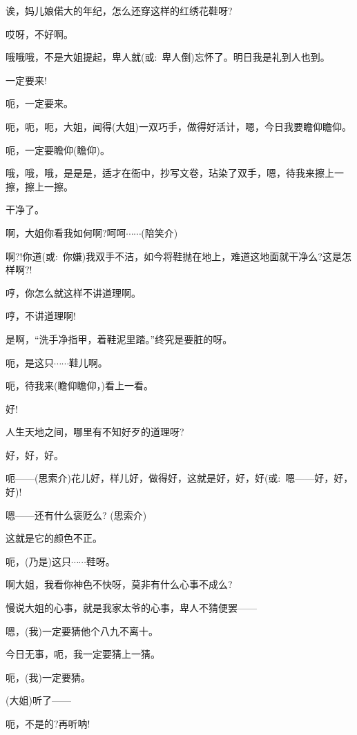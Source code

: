 {{诶，妈儿娘偌大的年纪，怎么还穿这样的红绣花鞋呀?}

{哎呀，不好啊。}

{哦哦哦，不是大姐提起，卑人就({\akai 或}:~卑人倒)忘怀了。明日我是礼到人也到。}

{一定要来!}

{呃，一定要来。}

{呃，呃，呃，大姐，闻得(大姐)一双巧手，做得好活计，嗯，今日我要瞻仰瞻仰。}

{呃，一定要瞻仰(瞻仰)。}

{哦，哦，哦，是是是，适才在衙中，抄写文卷，玷染了双手，嗯，待我来擦上一擦，擦上一擦。}

{干净了。}

{啊，大姐你看我如何啊?呵呵$\cdots{}\cdots{}$({\hwfs 陪笑介})}

{啊?!你道({\akai 或}:~你嫌)我双手不洁，如今将鞋抛在地上，难道这地面就干净么?这是怎样啊?!}

{哼，你怎么就这样不讲道理啊。}

{哼，不讲道理啊!}

{是啊，``洗手净指甲，着鞋泥里踏。''终究是要脏的呀。}

{呃，是这只$\cdots{}\cdots{}$鞋儿啊。}

{呃，待我来(瞻仰瞻仰，)看上一看。}

{好!}

{人生天地之间，哪里有不知好歹的道理呀?}

{好，好，好。}

{呃------({\hwfs 思索介})花儿好，样儿好，做得好，这就是好，好，好({\akai 或}:~嗯------好，好，好)!}

{嗯------还有什么褒贬么? ({\hwfs 思索介})}

{这就是它的颜色不正。}

{呃，(乃是)这只$\cdots{}\cdots{}$鞋呀。}

{啊大姐，我看你神色不快呀，莫非有什么心事不成么?}

{慢说大姐的心事，就是我家太爷的心事，卑人不猜便罢------}

{嗯，(我)一定要猜他个八九不离十。}

{今日无事，呃，我一定要猜上一猜。}

{呃，(我)一定要猜。}

{(大姐)听了------}


{呃，不是的?再听呐!}


}
